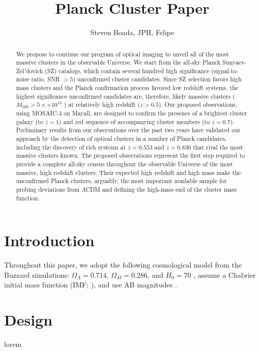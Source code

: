\documentclass[apj, revtex4]{emulateapj}
\begin{document}
	
\title{Planck Cluster Paper}
	
\author{\sc Steven Boada, JPH, Felipe} 
	


\begin{abstract}
	\noindent We propose to continue our program of optical imaging to unveil all of the most massive clusters in
	the observable Universe. We start from the all-sky Planck Sunyaev-Zel’dovich (SZ) catalogs, which
	contain several hundred high significance (signal-to-noise ratio, SNR $> 5$) unconfirmed cluster
	candidates. Since SZ selection favors high mass clusters and the Planck confirmation process favored
	low redshift systems, the highest significance unconfirmed candidates are, therefore, likely massive
	clusters ($M_{500} > 5 ×\times 10^{14}$ \Msol) at relatively high redshift ($z > 0.5$). Our proposed observations,
	using MOSAIC-3 on Mayall, are designed to confirm the presence of a brightest cluster galaxy (to
	$z \sim 1$) and red sequence of accompanying cluster members (to $z \sim 0.7$). Preliminary results from
	our observations over the past two years have validated our approach by the detection of optical
	clusters in a number of Planck candidates, including the discovery of rich systems at $z = 0.553$ and
	$z = 0.830$ that rival the most massive clusters known. The proposed observations represent the first
	step required to provide a complete all-sky census throughout the observable Universe of the most
	massive, high redshift clusters. Their expected high redshift and high mass make the unconfirmed
	Planck clusters, arguably, the most important available sample for probing deviations from $\Lambda$CDM
	and defining the high-mass end of the cluster mass function.
\end{abstract}

\section{Introduction}
Throughout this paper, we adopt the following cosmological model from the Buzzard simulations: $\Omega_\Lambda = 0.714$, $\Omega_M = 0.286$, and $H_0= 70$ \kms \mpc, assume a Chabrier initial mass function (IMF; \citealt{Chabrier2003}), and use AB magnitudes \citep{Oke1974}.

\section{Design}\label{sec:design}
lorem
\end{document}
